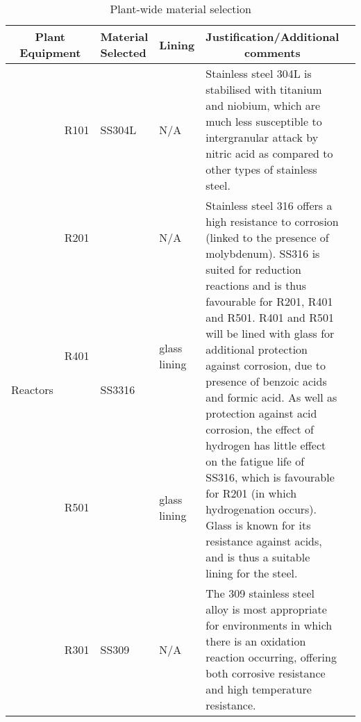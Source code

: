 

\begin{table}[H]
\centering
\caption{Plant-wide material selection}
\label{tab:material}
\begin{tabular}{@{}p{3cm}|p{3cm}|p{3cm}|p{3cm}|p{3cm}l@{}}
\toprule
\multicolumn{2}{c}{\textbf{Plant Equipment}}                                                                    & \textbf{Material   Selected}                                                                  & \textbf{Lining}                                    & \multicolumn{1}{c}{\textbf{Justification/Additional   comments}}              \\ \midrule
 \multirow{6}{*}{Reactors}    & R101                                                     & SS304L                                                                                        & N/A                                                & Stainless   steel 304L is stabilised with titanium and niobium, which are much less   susceptible to intergranular attack by nitric acid as compared to other types   of stainless steel.\\
     & R201     &   \multirow{3}{*}{SS3316}      & N/A      &  \multirow{3}{*}{Stainless   steel 316 offers a high resistance to corrosion (linked to the presence of   molybdenum). SS316 is suited for reduction reactions and is thus favourable   for R201, R401 and R501. R401 and R501 will be lined with glass for additional   protection against corrosion, due to presence of benzoic acids and formic   acid. As well as protection against acid corrosion, the effect of hydrogen   has little effect on the fatigue life of SS316, which is favourable for R201   (in which hydrogenation occurs). Glass is known for its resistance against   acids, and is thus a suitable lining for the steel.}                                  \\
        & R401       &          & glass lining       &   \\
   & R501                                                     &          & glass lining                                       &  \\
    & R301        &        \multirow{2}{*}{SS309}          &  \multirow{2}{*}{N/A}     &      \multirow{2}{*}{The   309 stainless steel alloy is most appropriate for environments in which there   is an oxidation reaction occurring, offering both corrosive resistance and   high temperature resistance.}                    \\

\end{tabular}
\end{table}
